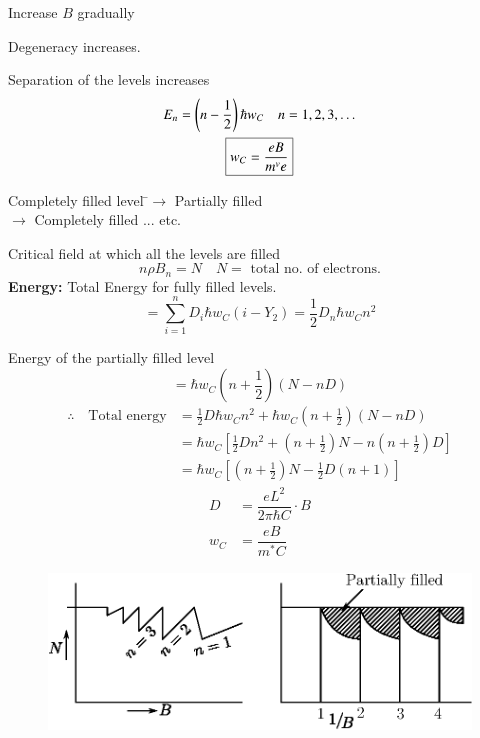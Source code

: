 Increase $B$ gradually

Degeneracy increases.

Separation of the levels increases
\begin{gather*}
E_{n}=\left(n-\frac{1}{2}\right)\hbar w_{C}\quad n=1,2,3,\ldots\\
\fbox{$w_{C}=\dfrac{eB}{m^{v}e}$}
\end{gather*}

\begin{tabbing}
Completely filled level \=$\to$ Partially filled\\[3pt]
\>$\to$ Completely filled ... etc.
\end{tabbing}

Critical field at which all the levels are filled
$$
n\rho B_{n}=N\quad N=\text{ total no. of electrons.}
$$
{\bf Energy:} Total Energy for fully filled levels.
$$
=\sum\limits^{n}_{i=1}D_{i}\hbar w_{C}(i-Y_{2})=\frac{1}{2}D_{n}\hbar w_{C}n^{2}
$$

Energy of the partially filled level
$$
=\hbar w_{C}\left(n+\frac{1}{2}\right)(N-nD)
$$
\begin{align*}
\therefore\quad \text{Total energy} &= \frac{1}{2}D\hbar w_{C}n^{2}+\hbar w_{C}\left(n+\frac{1}{2}\right)(N-nD)\\[3pt]
&= \hbar w_{C}\left[\frac{1}{2}Dn^{2}+\left(n+\frac{1}{2}\right)N-n\left(n+\frac{1}{2}\right)D\right]\\[3pt]
&= \hbar w_{C}\left[\left(n+\frac{1}{2}\right)N-\frac{1}{2}D(n+1)\right]
\end{align*}
\begin{align*}
D &= \dfrac{eL^{2}}{2\pi \hbar C}\cdot B\\[3pt]
w_{C} &= \dfrac{eB}{m^{*}C}
\end{align*}
\begin{figure}[H]
\centering
\includegraphics{images/lecture24/fig13.eps}
\end{figure}

